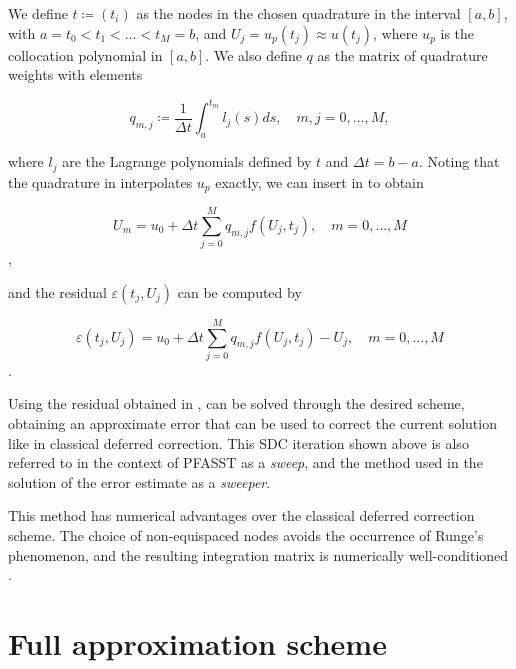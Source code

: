 We define \(t \coloneqq (t_i)\) as the nodes in the chosen quadrature in the interval \([a,b]\), with \(a = t_0 < t_1 < \ldots < t_M = b\), and \(U_j = u_p(t_j) \approx u(t_j)\), where \(u_p\) is the collocation polynomial in \([a,b]\). We also define \(q\) as the matrix of quadrature weights with elements

\begin{equation}
    q_{m,j} \coloneqq
    \frac{1}{\Delta t}
    \int^{t_m}_a l_j(s)ds, \quad m,j=0,\ldots,M,
    \label{eq:quadrature_q}
\end{equation}

where \(l_j\) are the Lagrange polynomials defined by \(t\) and \(\Delta t=b-a\). Noting that the quadrature in  interpolates \(u_p\) exactly, we can insert  in  to obtain

\begin{equation}
    U_m = u_0 + \Delta t 
    \sum_{j=0}^M q_{m,j} f(U_j, t_j), \quad m=0,\ldots,M
    \label{eq:sdc_element}
\end{equation},

and the residual \(\varepsilon(t_j,U_j)\) can be computed by

\begin{equation}
    \varepsilon(t_j,U_j) = u_0 + \Delta t 
    \sum_{j=0}^M q_{m,j} f(U_j, t_j) - U_j, \quad m=0,\ldots,M
    \label{eq:sdc_element_residual}
\end{equation}.

Using the residual obtained in ,  can be solved through the desired scheme, obtaining an approximate error that can be used to correct the current solution like in classical deferred correction. This SDC iteration shown above is also referred to in the context of PFASST as a \textit{sweep}, and the method used in the solution of the error estimate as a \textit{sweeper}.

This method has numerical advantages over the classical deferred correction scheme. The choice of non-equispaced nodes avoids the occurrence of Runge's phenomenon, and the resulting integration matrix is numerically well-conditioned \cite{dutt2000spectral}.

\section{Full approximation scheme} \label{sec:fas}

